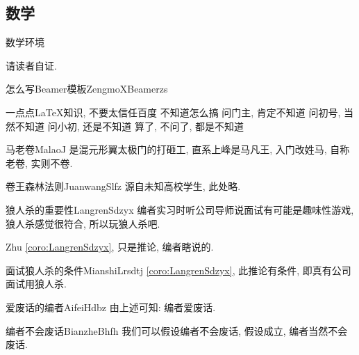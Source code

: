 \documentclass[hyperref,UTF8,11pt,CJK,handout]{beamer}
\begin{document}
\subsection{数学}
\begin{frame}{数学环境}
	\begin{scuproof}{}
		请读者自证.
	\end{scuproof}
	\begin{scualgorithm}{怎么写Beamer模板}{ZengmoXBeamerzs}
		\begin{algorithmic}[1]
		\REQUIRE 一点点\LaTeX 知识, 不要太信任百度
		\ENSURE 不知道怎么搞
		\STATE 问门主, 肯定不知道
		\STATE 问初号, 当然不知道
		\STATE 问小初, 还是不知道
		\RETURN 算了, 不问了, 都是不知道
		\end{algorithmic}
	\end{scualgorithm}
	\begin{scudefinition}{马老卷}{MalaoJ}
		是混元形翼太极门的打砸工, 直系上峰是马凡王, 入门改姓马, 自称老卷, 实则不卷.
	\end{scudefinition}
	\begin{sculemma}{卷王森林法则}{JuanwangSlfz}
		源自未知高校学生, 此处略.
	\end{sculemma}
	\begin{scucorollary}{狼人杀的重要性}{LangrenSdzyx}
		编者实习时听公司导师说面试有可能是趣味性游戏, 狼人杀感觉很符合, 所以玩狼人杀吧.
	\end{scucorollary}
	\begin{scuremark}{}{Zhu}
		\vref{coro:LangrenSdzyx}, 只是推论, 编者瞎说的.
	\end{scuremark}
	\begin{scucondition}{面试狼人杀的条件}{MianshiLrsdtj}
		\vref{coro:LangrenSdzyx}, 此推论有条件, 即真有公司面试用狼人杀.
	\end{scucondition}
	\begin{scuconclusion}{爱废话的编者}{AifeiHdbz}
		由上述可知: 编者爱废话.
	\end{scuconclusion}
	\begin{scuassumption}{编者不会废话}{BianzheBhfh}
		我们可以假设编者不会废话, 假设成立, 编者当然不会废话.
	\end{scuassumption}
\end{frame}
\end{document}
